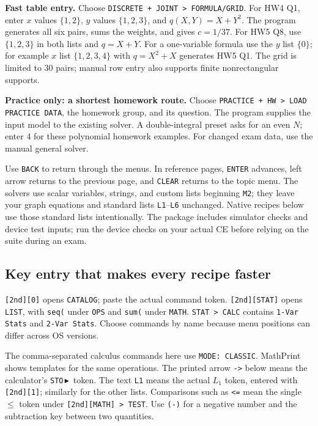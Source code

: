 \textbf{Fast table entry.} Choose \texttt{DISCRETE + JOINT > FORMULA/GRID}. For HW4 Q1, enter $x$ values $\{1,2\}$, $y$ values $\{1,2,3\}$, and $q(X,Y)=X+Y^2$. The program generates all six pairs, sums the weights, and gives $c=1/37$. For HW5 Q8, use $\{1,2,3\}$ in both lists and $q=X+Y$. For a one-variable formula use the $y$ list $\{0\}$; for example $x$ list $\{1,2,3,4\}$ with $q=X^2+X$ generates HW5 Q1. The grid is limited to 30 pairs; manual row entry also supports finite nonrectangular supports.

\textbf{Practice only: a shortest homework route.} Choose \texttt{PRACTICE + HW > LOAD PRACTICE DATA}, the homework group, and its question. The program supplies the input model to the existing solver. A double-integral preset asks for an even $N$; enter 4 for these polynomial homework examples. For changed exam data, use the manual general solver.

Use \texttt{BACK} to return through the menus. In reference pages, \texttt{ENTER} advances, left arrow returns to the previous page, and \texttt{CLEAR} returns to the topic menu. The solvers use scalar variables, strings, and custom lists beginning \texttt{M2}; they leave your graph equations and standard lists \texttt{L1}--\texttt{L6} unchanged. Native recipes below use those standard lists intentionally. The package includes simulator checks and device test inputs; run the device checks on your actual CE before relying on the suite during an exam.

\subsection{Key entry that makes every recipe faster}
\texttt{[2nd][0]} opens \texttt{CATALOG}; paste the actual command token. \texttt{[2nd][STAT]} opens \texttt{LIST}, with \texttt{seq(} under \texttt{OPS} and \texttt{sum(} under \texttt{MATH}. \texttt{STAT > CALC} contains \texttt{1-Var Stats} and \texttt{2-Var Stats}. Choose commands by name because menu positions can differ across OS versions.

The comma-separated calculus commands here use \texttt{MODE: CLASSIC}. MathPrint shows templates for the same operations. The printed arrow \texttt{->} below means the calculator's \texttt{STO}\,$\blacktriangleright$\ token. The text \texttt{L1} means the actual $L_1$ token, entered with \texttt{[2nd][1]}; similarly for the other lists. Comparisons such as \texttt{<=} mean the single $\le$ token under \texttt{[2nd][MATH] > TEST}. Use \texttt{(-)} for a negative number and the subtraction key between two quantities.

